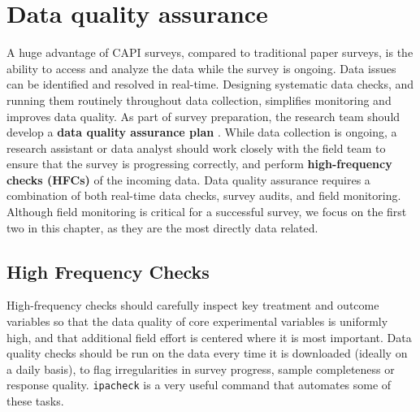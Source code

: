 \section{Data quality assurance}
A huge advantage of CAPI surveys, compared to traditional paper surveys, is the ability to access and analyze the data while the survey is ongoing.
Data issues can be identified and resolved in real-time. Designing systematic data checks, and running them routinely throughout data collection, simplifies monitoring and improves data quality.
As part of survey preparation, the research team should develop a \textbf{data quality assurance plan} .
While data collection is ongoing, a research assistant or data analyst should work closely with the field team to ensure that the survey is progressing correctly, and perform \textbf{high-frequency checks (HFCs)} of the incoming data.
Data quality assurance requires a combination of both real-time data checks, survey audits, and field monitoring. Although field monitoring is critical for a successful survey, we focus on the first two in this chapter, as they are the most directly data related.


\subsection{High Frequency Checks}
High-frequency checks should carefully inspect key treatment and outcome variables so that the data quality of core experimental variables is uniformly high, and that additional field effort is centered where it is most important.
Data quality checks should be run on the data every time it is downloaded (ideally on a daily basis), to flag irregularities in survey progress, sample completeness or response quality. \texttt{ipacheck}
is a very useful command that automates some of these tasks.

